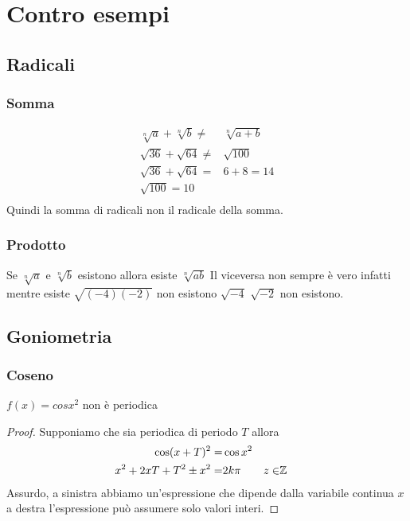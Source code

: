 \chapter{Contro esempi}
\section{Radicali}
\subsection{Somma}
\begin{cexmp}
\begin{align*}
\sqrt[n]{a}+\sqrt[n]{b}\neq&\sqrt[n]{a+b}\\
\sqrt{36}+\sqrt{64}\neq&\sqrt{100}\\
\sqrt{36}+\sqrt{64}=&6+8=14\\
\sqrt{100}=10\\
\end{align*}
Quindi la somma di radicali non il radicale della somma.
\end{cexmp}
\subsection{Prodotto}
\begin{cexmp}[Esistenza]
	Se $\sqrt[n]{a}$ e $\sqrt[n]{b}$ esistono allora esiste $\sqrt[n]{ab}$ Il viceversa non sempre è vero infatti mentre esiste $\sqrt{(-4)(-2)}$ non esistono   $\sqrt{-4}$ $\sqrt{-2}$ non esistono.
\end{cexmp}
\section{Goniometria}
\subsection{Coseno}
\begin{cexmp}
	$f(x)=cosx^2$ non è periodica
\end{cexmp}
\begin{proof}
	Supponiamo che sia periodica di periodo $T$ allora
	\begin{align*}
	\cos(x+T)^2=&\cos x^2\\
	x^2+2xT+T^2\pm x^2=&2k\pi&z\in&\mathbb{Z}\\
	\end{align*}
	Assurdo, a sinistra abbiamo un'espressione che dipende dalla variabile continua $x$ a destra l'espressione può assumere solo valori interi.
\end{proof}